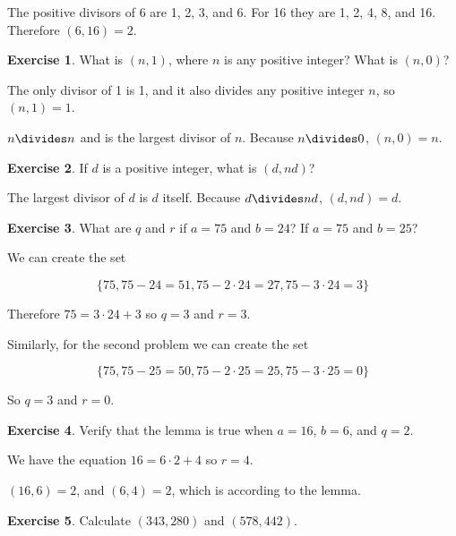 \documentclass{article}
\theoremstyle{definition}
\newtheorem{exercise}{Exercise}[section]
\begin{document}
  The positive divisors of 6 are 1, 2, 3, and 6. For 16 they are 1, 2, 4, 8, and 16. Therefore $(6, 16) = 2$.
  
  \begin{exercise}
    What is $(n, 1)$, where $n$ is any positive integer? What is $(n, 0)$?
  \end{exercise}
  
  The only divisor of 1 is 1, and it also divides any positive integer $n$, so $(n, 1) = 1$.
  
  $n \divides n$ and is the largest divisor of $n$. Because $n \divides 0$, $(n, 0) = n$.
  
  \begin{exercise}
    If $d$ is a positive integer, what is $(d, nd)$?
  \end{exercise}

  The largest divisor of $d$ is $d$ itself. Because $d \divides nd$, $(d, nd) = d$.
  
  \begin{exercise}
    What are $q$ and $r$ if $a = 75$ and $b = 24$? If $a = 75$ and $b = 25$?
  \end{exercise}
  
  We can create the set
  
  \begin{equation*}
    \{75, 75 - 24 = 51, 75 - 2 \cdot 24 = 27, 75 - 3 \cdot 24 = 3\}
  \end{equation*}
  
  Therefore $75 = 3 \cdot 24 + 3$ so $q = 3$ and $r = 3$.
  
  Similarly, for the second problem we can create the set
  
    \begin{equation*}
      \{75, 75 - 25 = 50, 75 - 2 \cdot 25 = 25, 75 - 3 \cdot 25 = 0\}
    \end{equation*}
  
  So $q = 3$ and $r = 0$.
  
  \begin{exercise}
    Verify that the lemma is true when $a = 16$, $b = 6$, and $q = 2$.
  \end{exercise}
  
  We have the equation $16 = 6 \cdot 2 + 4$ so $r = 4$.
  
  $(16, 6) = 2$, and $(6, 4) = 2$, which is according to the lemma.
  
  \begin{exercise}
    Calculate $(343, 280)$ and $(578, 442)$.
  \end{exercise}
  
\end{document}
